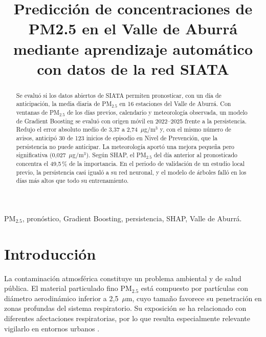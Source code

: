 \documentclass[conference]{IEEEtran}
\begin{document}

\title{Predicción de concentraciones de PM2.5 en el Valle de Aburrá mediante aprendizaje automático con datos de la red SIATA}

\author{

}

\maketitle

\begin{abstract}
Se evaluó si los datos abiertos de SIATA permiten pronosticar, con un día
de anticipación, la media diaria de PM$_{2.5}$ en 16 estaciones del Valle
de Aburrá. Con ventanas de PM$_{2.5}$ de los días previos, calendario y
meteorología observada, un modelo de Gradient Boosting se evaluó con origen
móvil en 2022--2025 frente a la persistencia. Redujo el error absoluto
medio de 3,37 a 2,74~$\mu$g/m$^3$ y, con el mismo número de avisos, anticipó
30 de 123 inicios de episodio en Nivel de Prevención, que la persistencia
no puede anticipar. La meteorología aportó una mejora pequeña pero
significativa (0,027~$\mu$g/m$^3$). Según SHAP, el PM$_{2.5}$ del día
anterior al pronosticado concentra el 49,5\,\% de la importancia. En el
periodo de validación de un estudio local previo, la persistencia casi
igualó a su red neuronal, y el modelo de árboles falló en los días más
altos que todo su entrenamiento.
\end{abstract}

\begin{IEEEkeywords}
PM$_{2.5}$, pronóstico, Gradient Boosting, persistencia, SHAP, Valle de
Aburrá.
\end{IEEEkeywords}



\section{Introducción}
\label{sec:introduccion}

La contaminación atmosférica constituye un problema ambiental y de salud
pública. El material particulado fino PM$_{2.5}$ está compuesto por partículas
con diámetro aerodinámico inferior a 2,5~$\mu$m, cuyo tamaño favorece su
penetración en zonas profundas del sistema respiratorio. Su exposición se ha
relacionado con diferentes afectaciones respiratorias, por lo que resulta
especialmente relevante vigilarlo en entornos urbanos
\cite{grisales2022relacion,parra2020analitica}.
\end{document}
